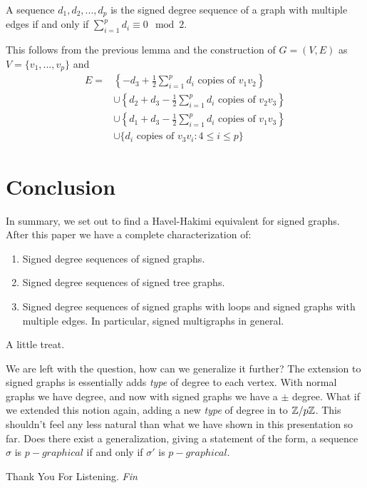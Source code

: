 \begin{frame}
	\begin{theorem}
		A sequence $d_1, d_2, ..., d_p$ is the signed degree sequence of a graph with multiple edges if and only if $\sum_{i = 1}^{p} d_i \equiv 0 \mod 2$.
	\end{theorem}
	This follows from the previous lemma and the construction of $G = (V,E)$ as $V = \{ v_1, ..., v_p \}$ and 
		\begin{align*}
			E = 
				& \left\{ -d_3 + \frac{1}{2}\sum_{i = 1}^{p} d_i \text{ copies of }  v_1v_2\right\} \\
				& \cup \left\{ d_2 + d_3 - \frac{1}{2}\sum_{i = 1}^{p} d_i \text{ copies of } v_2v_3\right\} \\
				& \cup \left\{ d_1 + d_3 - \frac{1}{2}\sum_{i = 1}^{p} d_i \text{ copies of } v_1v_3\right\} \\ 
				& \cup \{ d_i \text{ copies of } v_3v_i : 4 \leq i \leq p \}
		\end{align*}
\end{frame}



\section{Conclusion}


\begin{frame}
	In summary, we set out to find a Havel-Hakimi equivalent for signed graphs. After this paper we have a complete characterization of:
		\begin{enumerate}
			\item Signed degree sequences of signed graphs.
			\item Signed degree sequences of signed tree graphs.
			\item Signed degree sequences of signed graphs with loops and signed graphs with multiple edges. In particular, signed multigraphs in general.
		\end{enumerate}
\end{frame}


\begin{frame}{A little treat.}
	\begin{problem}
		We are left with the question, how can we generalize it further?
		The extension to signed graphs is essentially adds \textit{type} of degree to each vertex. With normal graphs we have degree, and now with signed graphs we have a $\pm$ degree.
		What if we extended this notion again, adding a new \textit{type} of degree in to $\Bbb Z/p \Bbb Z$. This shouldn't feel any less natural than what we have shown in this presentation so far.
		Does there exist a generalization, giving a statement of the form, a sequence $\sigma$ is $p-graphical$ if and only if $\sigma'$ is $p-graphical$.
	\end{problem}
\end{frame}

\begin{frame}{Thank You For Listening.}
	\centering \Huge
	\emph{Fin}
\end{frame}
